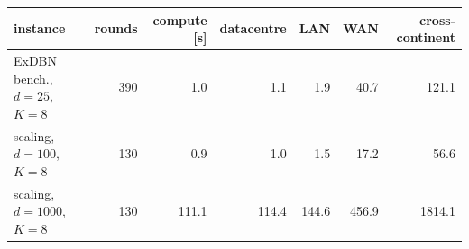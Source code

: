 \begin{tabular}{l r r rrrr}
\toprule
instance & rounds & compute [s] & datacentre & LAN & WAN & cross-continent \\
\midrule
ExDBN bench., $d{=}25$, $K{=}8$ & 390 & 1.0 & 1.1 & 1.9 & 40.7 & 121.1 \\
scaling, $d{=}100$, $K{=}8$ & 130 & 0.9 & 1.0 & 1.5 & 17.2 & 56.6 \\
scaling, $d{=}1000$, $K{=}8$ & 130 & 111.1 & 114.4 & 144.6 & 456.9 & 1814.1 \\
\bottomrule
\end{tabular}
